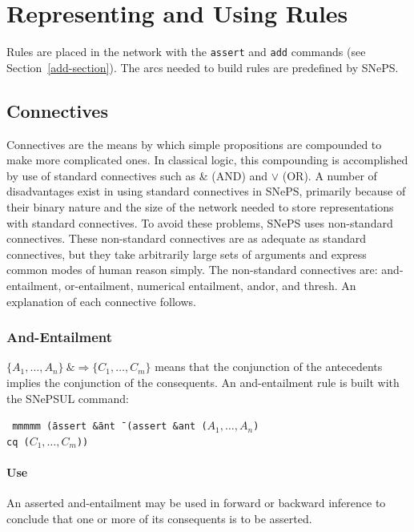 \documentclass{book}
\begin{document}
\section{Representing and Using Rules}

Rules are placed in the network with the {\tt assert} and {\tt add} commands (see Section~\ref{add-section}).
The arcs needed to build rules are predefined by SNePS.

\subsection{Connectives} \label{connective-section}

Connectives are the means by which simple propositions are compounded
to make more complicated ones.  In classical logic, this compounding
is accomplished by use of standard connectives such as \& (AND) and
$\vee$ (OR).  A number of disadvantages exist in using standard
connectives in SNePS, primarily because of their binary nature and the
size of the network needed to store representations with standard
connectives.  To avoid these problems, SNePS uses non-standard
connectives.  These non-standard connectives are as adequate as
standard connectives, but they take arbitrarily large sets of
arguments and express common modes of human reason simply.  The
non-standard connectives are: and-entailment, or-entailment, numerical
entailment, andor, and thresh.  An explanation
of each connective follows.

\subsubsection{And-Entailment}

$\{A_1, \ldots, A_n\} \: \&\!\!\!\Rightarrow \{C_1, \ldots, C_m\}$
means that the conjunction of the antecedents implies the conjunction of the
consequents.  An and-entailment rule is built with the SNePSUL command:
\begin{tabbing} \tt
mmmmm \=(assert \=\&ant \= \kill
      \>(assert \>\&ant \>($A_1, \ldots, A_n$) \\
      \>        \>cq    \>($C_1, \ldots, C_m$))
\end{tabbing}

\paragraph{Use}

An asserted and-entailment may be used in forward or backward inference to conclude that one or more
of its consequents is to be asserted.
\end{document}
